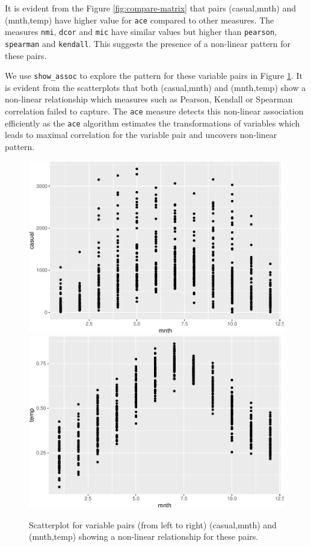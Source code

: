 It is evident from the Figure \ref{fig:compare-matrix} that pairs
(casual,mnth) and (mnth,temp) have higher value for \texttt{ace}
compared to other measures. The measures \texttt{nmi}, \texttt{dcor} and
\texttt{mic} have similar values but higher than \texttt{pearson},
\texttt{spearman} and \texttt{kendall}. This suggests the presence of a
non-linear pattern for these pairs.

We use \texttt{show\_assoc} to explore the pattern for these variable
pairs in Figure \ref{fig:int-pairs-multiple}. It is evident from the
scatterplots that both (casual,mnth) and (mnth,temp) show a non-linear
relationship which measures such as Pearson, Kendall or Spearman
correlation failed to capture. The \texttt{ace} measure detects this
non-linear association efficiently as the \texttt{ace} algorithm
estimates the transformations of variables which leads to maximal
correlation for the variable pair and uncovers non-linear pattern.

\begin{Schunk}
\begin{figure}
\includegraphics[width=0.5\linewidth]{rj_paper_files/figure-latex/int-pairs-multiple-1} \includegraphics[width=0.5\linewidth]{rj_paper_files/figure-latex/int-pairs-multiple-2} \caption[Scatterplot for variable pairs (from left to right) (casual,mnth) and (mnth,temp) showing a non-linear relationship for these pairs]{Scatterplot for variable pairs (from left to right) (casual,mnth) and (mnth,temp) showing a non-linear relationship for these pairs.}\label{fig:int-pairs-multiple}
\end{figure}
\end{Schunk}

